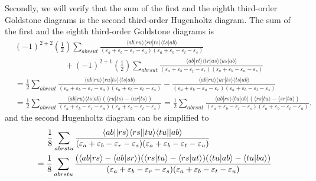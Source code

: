 \documentclass[a4paper]{book}
\newcounter{solution}[chapter]
\begin{document}
\begin{solution}
	Secondly, we will verify that the sum of the first and the eighth third-order Goldstone diagrams is the second third-order Hugenholtz diagram. The sum of the first and the eighth third-order Goldstone diagrams is
	\begin{align*}
		&(-1)^{2+2} \left( \frac{1}{2} \right) \sum_{abrsut} \frac{ \langle ab | ru \rangle \langle ru | ts \rangle \langle ts | ab \rangle }{ ( \varepsilon_a + \varepsilon_b - \varepsilon_r - \varepsilon_u ) ( \varepsilon_a + \varepsilon_b - \varepsilon_t - \varepsilon_s ) } \\
		&\hspace{6em}+ (-1)^{2+1} \left( \frac{1}{2} \right) \sum_{abrsut} \frac{ \langle ab | rt \rangle \langle tr | us \rangle \langle us | ab \rangle }{ ( \varepsilon_a + \varepsilon_b - \varepsilon_t - \varepsilon_r ) ( \varepsilon_a + \varepsilon_b - \varepsilon_u - \varepsilon_s ) } \\
		&= \frac{1}{2} \sum_{abrsut} \frac{ \langle ab | ru \rangle \langle ru | ts \rangle \langle ts | ab \rangle }{ ( \varepsilon_a + \varepsilon_b - \varepsilon_r - \varepsilon_u ) ( \varepsilon_a + \varepsilon_b - \varepsilon_t - \varepsilon_s ) } - \frac{ \langle ab | ru \rangle \langle ur | ts \rangle \langle ts | ab \rangle }{ ( \varepsilon_a + \varepsilon_b - \varepsilon_u - \varepsilon_r ) ( \varepsilon_a + \varepsilon_b - \varepsilon_t - \varepsilon_s ) } \\
		&= \frac{1}{2} \sum_{abrsut} \frac{ \langle ab | ru \rangle \langle ts | ab \rangle ( \langle ru | ts \rangle - \langle ur | ts \rangle ) }{ ( \varepsilon_a + \varepsilon_b - \varepsilon_r - \varepsilon_u ) ( \varepsilon_a + \varepsilon_b - \varepsilon_t - \varepsilon_s ) } = \frac{1}{2} \sum_{abrsut} \frac{ \langle ab | rs \rangle \langle tu | ab \rangle ( \langle rs | tu \rangle - \langle sr | tu \rangle ) }{ ( \varepsilon_a + \varepsilon_b - \varepsilon_r - \varepsilon_s ) ( \varepsilon_a + \varepsilon_b - \varepsilon_t - \varepsilon_u ) }.
	\end{align*}
	and the second Hugenholtz diagram can be simplified to
	\begin{align*}
		&\hspace{1.4em} \frac{1}{8} \sum_{abrstu} \frac{ \langle ab || rs \rangle \langle rs || tu \rangle \langle tu || ab \rangle }{ ( \varepsilon_a + \varepsilon_b - \varepsilon_r - \varepsilon_s ) ( \varepsilon_a + \varepsilon_b - \varepsilon_t - \varepsilon_u ) } \\
		&= \frac{1}{8} \sum_{abrstu} \frac{ ( \langle ab | rs \rangle - \langle ab | sr \rangle )( \langle rs | tu \rangle - \langle rs | ut \rangle ) ( \langle tu | ab \rangle - \langle tu | ba \rangle ) }{ ( \varepsilon_a + \varepsilon_b - \varepsilon_r - \varepsilon_s ) ( \varepsilon_a + \varepsilon_b - \varepsilon_t - \varepsilon_u ) } \\

\end{align*}
\end{solution}
\end{document}
